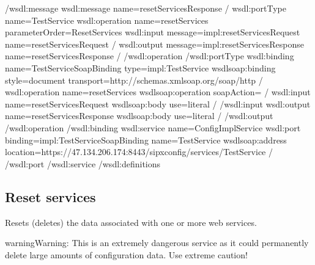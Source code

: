\documentclass[letterpaper,10pt,english]{sphinxmanual}
\begin{document}
\begin{sphinxVerbatim}[commandchars=\\\{\}]
\PYGZlt{}/wsdl:message\PYGZgt{}
\PYGZlt{}wsdl:message name=\PYGZdq{}resetServicesResponse\PYGZdq{} /\PYGZgt{}
\PYGZlt{}wsdl:portType name=\PYGZdq{}TestService\PYGZdq{}\PYGZgt{}
\PYGZlt{}wsdl:operation name=\PYGZdq{}resetServices\PYGZdq{} parameterOrder=\PYGZdq{}ResetServices\PYGZdq{}\PYGZgt{}
\PYGZlt{}wsdl:input message=\PYGZdq{}impl:resetServicesRequest\PYGZdq{} name=\PYGZdq{}resetServicesRequest\PYGZdq{} /\PYGZgt{}
\PYGZlt{}wsdl:output message=\PYGZdq{}impl:resetServicesResponse\PYGZdq{} name=\PYGZdq{}resetServicesResponse\PYGZdq{} /\PYGZgt{}
\PYGZlt{}/wsdl:operation\PYGZgt{}
\PYGZlt{}/wsdl:portType\PYGZgt{}
\PYGZlt{}wsdl:binding name=\PYGZdq{}TestServiceSoapBinding\PYGZdq{} type=\PYGZdq{}impl:TestService\PYGZdq{}\PYGZgt{}
\PYGZlt{}wsdlsoap:binding style=\PYGZdq{}document\PYGZdq{} transport=\PYGZdq{}http://schemas.xmlsoap.org/soap/http\PYGZdq{} /\PYGZgt{}
\PYGZlt{}wsdl:operation name=\PYGZdq{}resetServices\PYGZdq{}\PYGZgt{}
\PYGZlt{}wsdlsoap:operation soapAction=\PYGZdq{}\PYGZdq{} /\PYGZgt{}
\PYGZlt{}wsdl:input name=\PYGZdq{}resetServicesRequest\PYGZdq{}\PYGZgt{}
\PYGZlt{}wsdlsoap:body use=\PYGZdq{}literal\PYGZdq{} /\PYGZgt{}
\PYGZlt{}/wsdl:input\PYGZgt{}
\PYGZlt{}wsdl:output name=\PYGZdq{}resetServicesResponse\PYGZdq{}\PYGZgt{}
\PYGZlt{}wsdlsoap:body use=\PYGZdq{}literal\PYGZdq{} /\PYGZgt{}
\PYGZlt{}/wsdl:output\PYGZgt{}
\PYGZlt{}/wsdl:operation\PYGZgt{}
\PYGZlt{}/wsdl:binding\PYGZgt{}
\PYGZlt{}wsdl:service name=\PYGZdq{}ConfigImplService\PYGZdq{}\PYGZgt{}
\PYGZlt{}wsdl:port binding=\PYGZdq{}impl:TestServiceSoapBinding\PYGZdq{} name=\PYGZdq{}TestService\PYGZdq{}\PYGZgt{}
\PYGZlt{}wsdlsoap:address location=\PYGZdq{}https://47.134.206.174:8443/sipxconfig/services/TestService\PYGZdq{} /\PYGZgt{}
\PYGZlt{}/wsdl:port\PYGZgt{}
\PYGZlt{}/wsdl:service\PYGZgt{}
\PYGZlt{}/wsdl:definitions\PYGZgt{}
\end{sphinxVerbatim}


\subsection{Reset services}
\label{\detokenize{soapapi:reset-services}}
 

 Resets (deletes) the data associated with one or more web services.

\begin{sphinxadmonition}{warning}{Warning:}
This is an extremely dangerous service as it could permanently delete large amounts of configuration data. Use extreme caution!
\end{sphinxadmonition}
\end{document}
